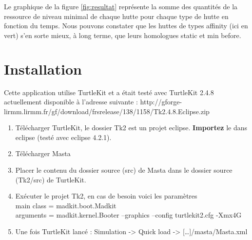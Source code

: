   Le graphique de la figure \vref{fig:resultat} représente la somme des quantités
  de la ressource de niveau minimal de chaque hutte pour chaque type
  de hutte en fonction du temps. Nous pouvons constater que les huttes
  de types \og{}affinity\fg{} (ici en vert) s'en sorte mieux, à long
  terme, que leurs homologues \og{}static\fg{} et \og{}min
  before\fg{}.

\section{Installation}

Cette application utilise TurtleKit et a était testé avec TurtleKit
2.4.8 actuellement disponible à l'adresse suivante :
http://gforge-lirmm.lirmm.fr/gf/download/frsrelease/138/1158/Tk2.4.8.Eclipse.zip

\begin{enumerate}
\item Télécharger TurtleKit, le dossier Tk2 est un projet
eclipse. {\bf Importez} le dans eclipse (testé avec eclipse 4.2.1).
\item Télécharger Masta
\item Placer le contenu du dossier source (src) de Masta dans le
dossier source (Tk2/src) de TurtleKit.
\item Exécuter le projet Tk2, en cas de besoin voici les paramètres \\
main class = madkit.boot.Madkit \\
arguments = madkit.kernel.Booter --graphics --config turtlekit2.cfg
-Xmx4G \\
\item Une fois TurtleKit lancé : Simulation -> Quick load ->
[\ldots]/masta/Masta.xml
\end{enumerate}
  